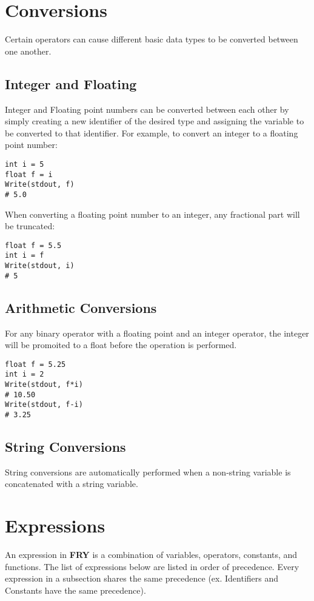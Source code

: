 \documentclass{article}
\begin{document}
\section{Conversions}
Certain operators can cause different basic data types to be converted between one another.
\subsection{Integer and Floating}
Integer and Floating point numbers can be converted between each other by simply creating a new identifier of the desired type and assigning the variable to be converted to that identifier. For example, to convert an integer to a floating point number:
\begin{lstlisting}
int i = 5
float f = i
Write(stdout, f)
# 5.0
\end{lstlisting}
When converting a floating point number to an integer, any fractional part will be truncated:
\begin{lstlisting}
float f = 5.5
int i = f
Write(stdout, i)
# 5
\end{lstlisting}
\subsection{Arithmetic Conversions}
For any binary operator with a floating point and an integer operator, the integer will be promoited to a float before the operation is performed.
\begin{lstlisting}
float f = 5.25
int i = 2
Write(stdout, f*i)
# 10.50
Write(stdout, f-i)
# 3.25
\end{lstlisting}
\subsection{String Conversions}
String conversions are automatically performed when a non-string variable is concatenated with a string variable. 

\section{Expressions}
\label{sec:expr}
An expression in \textbf{FRY} is a combination of variables, operators, constants, and functions. The list of expressions below are listed in order of precedence. Every expression in a subsection shares the same precedence (ex. Identifiers and Constants have the same precedence).
\end{document}
